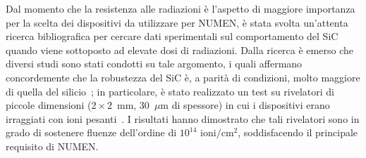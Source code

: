 Dal momento che la resistenza alle radiazioni è l'aspetto di maggiore importanza per la scelta dei dispositivi da utilizzare per NUMEN, è stata svolta un'attenta ricerca bibliografica per cercare dati sperimentali sul comportamento del SiC quando viene sottoposto ad elevate dosi di radiazioni.
Dalla ricerca è emerso che diversi studi sono stati condotti su tale argomento, i quali affermano concordemente che la robustezza del SiC è, a parità di condizioni, molto maggiore di quella del silicio~\cite{garcialopez:nimb16, nava:nima03}; in particolare, è stato realizzato un test su rivelatori di piccole dimensioni ($2 \times 2$~mm, 30~$\mu$m di spessore) in cui i dispositivi erano irraggiati con ioni pesanti~\cite{raciti:npa10}.
I risultati hanno dimostrato che tali rivelatori sono in grado di sostenere fluenze dell'ordine di $10^{14}$  $\mbox{ioni}/\mbox{cm}^2$, soddisfacendo il principale requisito di NUMEN.




